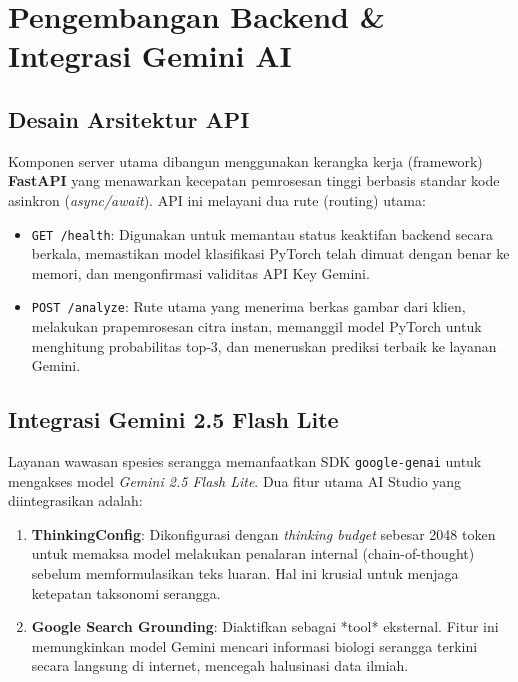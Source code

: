 \documentclass[12pt, a4paper]{article}
\begin{document}
\newpage
\section{Pengembangan Backend \& Integrasi Gemini AI}

\subsection{Desain Arsitektur API}
Komponen server utama dibangun menggunakan kerangka kerja (framework) \textbf{FastAPI} yang menawarkan kecepatan pemrosesan tinggi berbasis standar kode asinkron (\textit{async/await}). API ini melayani dua rute (routing) utama:
\begin{itemize}
    \item \texttt{GET /health}: Digunakan untuk memantau status keaktifan backend secara berkala, memastikan model klasifikasi PyTorch telah dimuat dengan benar ke memori, dan mengonfirmasi validitas API Key Gemini.
    \item \texttt{POST /analyze}: Rute utama yang menerima berkas gambar dari klien, melakukan prapemrosesan citra instan, memanggil model PyTorch untuk menghitung probabilitas top-3, dan meneruskan prediksi terbaik ke layanan Gemini.
\end{itemize}

\subsection{Integrasi Gemini 2.5 Flash Lite}
Layanan wawasan spesies serangga memanfaatkan SDK \texttt{google-genai} untuk mengakses model \textit{Gemini 2.5 Flash Lite}. Dua fitur utama AI Studio yang diintegrasikan adalah:
\begin{enumerate}
    \item \textbf{ThinkingConfig}: Dikonfigurasi dengan \textit{thinking budget} sebesar 2048 token untuk memaksa model melakukan penalaran internal (chain-of-thought) sebelum memformulasikan teks luaran. Hal ini krusial untuk menjaga ketepatan taksonomi serangga.
    \item \textbf{Google Search Grounding}: Diaktifkan sebagai *tool* eksternal. Fitur ini memungkinkan model Gemini mencari informasi biologi serangga terkini secara langsung di internet, mencegah halusinasi data ilmiah.
\end{enumerate}
\end{document}
